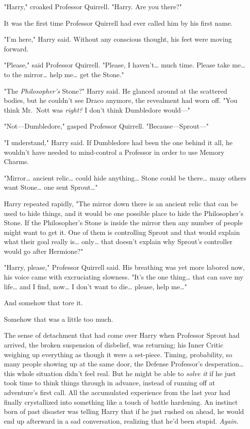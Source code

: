 "Harry," croaked Professor Quirrell. "Harry. Are you there?"

It was the first time Professor Quirrell had ever called him by his first name.

"I'm here," Harry said. Without any conscious thought, his feet were moving 
forward.

"Please," said Professor Quirrell. "Please, I haven't{\ldots} much time. Please 
take me{\ldots} to the mirror{\ldots} help me{\ldots} get the Stone."

"The \emph{Philosopher's} Stone?" Harry said. He glanced around at the 
scattered bodies, but he couldn't see Draco anymore, the revealment had worn 
off. "You think Mr.~Nott was \emph{right?} I don't think Dumbledore would---"

"Not---Dumbledore," gasped Professor Quirrell. "Because---Sprout---"

"I understand," Harry said. If Dumbledore had been the one behind it all, he 
wouldn't have needed to mind-control a Professor in order to use Memory Charms.

"Mirror{\ldots} ancient relic{\ldots} could hide anything{\ldots} Stone could 
be there{\ldots} many others want Stone{\ldots} one sent Sprout{\ldots}"

Harry repeated rapidly, "The mirror down there is an ancient relic that can be 
used to hide things, and it would be one possible place to hide the 
Philosopher's Stone. If the Philosopher's Stone is inside the mirror then any 
number of people might want to get it. One of them is controlling Sprout and 
that would explain what their goal really is{\ldots} only{\ldots} that doesn't 
explain why Sprout's controller would go after Hermione?"

"Harry, please," Professor Quirrell said. His breathing was yet more labored 
now, his voice came with excruciating slowness. "It's the one thing{\ldots} 
that can save my life{\ldots} and I find, now{\ldots} I don't want to 
die{\ldots} please, help me{\ldots}"

And somehow that tore it.

Somehow that was a little too much.

The sense of detachment that had come over Harry when Professor Sprout had 
arrived, the broken suspension of disbelief, was returning; his Inner Critic 
weighing up everything as though it were a set-piece. Timing, probability, so 
many people showing up at the same door, the Defense Professor's 
desperation{\ldots} this whole situation didn't feel real. But he might be able 
to \emph{solve it} if he just took time to think things through in advance, 
instead of running off at adventure's first call. All the accumulated 
experience from the last year had finally crystallized into something like a 
touch of battle hardening. An instinct born of past disaster was telling Harry 
that if he just rushed on ahead, he would end up afterward in a sad 
conversation, realizing that he'd been stupid. \emph{Again.}

